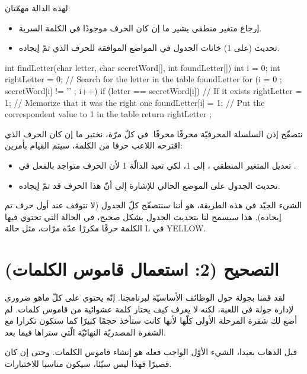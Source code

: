 لهذه الدالة مهمّتان:

\begin{itemize}
  \item إرجاع متغير منطقي يشير ما إن كان الحرف موجودًا في الكلمة السرية.
  \item تحديث (على 1) خانات الجدول
في المواضع الموافقة للحرف الذي تمّ إيجاده.
\end{itemize}

\begin{Csource}
int findLetter(char letter, char secretWord[], int foundLetter[])
{
  int i = 0;
  int rightLetter = 0;
  // Search for the letter in the table foundLetter
  for (i = 0 ; secretWord[i] != '\0' ; i++)
  {
    if (letter == secretWord[i]) // If it exists
    {
      rightLetter = 1; // Memorize that it was the right one
      foundLetter[i] = 1; // Put the correspondent value to 1 in the table
    }
  }
  return rightLetter ;
}
\end{Csource}

نتصفّح إذن السلسلة المحرفيّة
محرفًا محرفًا. في كلّ مرّة، نختبر ما إن كان الحرف الذي اقترحه اللاعب حرفا من الكلمة، سيتم القيام بأمرين:
\begin{itemize}
  \item تعديل المتغير المنطقي
،
إلى  1، لكي تعيد الدالّة 1 لأن الحرف متواجد بالفعل في
.
  \item تحديث الجدول
على الموضع الحالي للإشارة إلى أنّ هذا الحرف قد تمّ إيجاده.
\end{itemize}

الشيء الجيّد في هذه الطريقة، هو أننا سنتصفّح كلّ الجدول (لا نتوقف عند أول حرف تم إيجاده). هذا سيسمح لنا بتحديث الجدول
بشكل صحيح، في الحالة التي تحتوي فيها الكلمة حرفًا مكررًا عدّة مرّات، مثل حالة
\textenglish{L}
في
\textenglish{YELLOW}.

\section{التصحيح (2: استعمال قاموس الكلمات)}
لقد قمنا بجولة حول الوظائف الأساسيّة لبرنامجنا. إنّه يحتوي على كلّ ماهو ضروري لإدارة جولة في اللعبة، لكنه لا يعرف كيف يختار كلمة عشوائية من قاموس كلمات. لم أضع لك شفرة المرحلة الأولى كلّها لأنها كانت ستأخذ حجمًا كبيرًا كما ستكون تكرارا مع الشفرة المصدريّة النهائيّة الّتي ستراها فيما بعد.

قبل الذهاب بعيدا، الشيء الأوّل الواجب فعله هو إنشاء قاموس الكلمات. وحتى إن كان قصيرًا فهذا ليس سيّئا، سيكون مناسبا للاختبارات.

